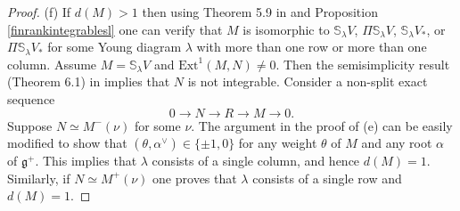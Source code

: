 \documentclass[12pt]{amsart}
\makeatletter
\def\@putname#1#2#3#4{\def\@@ref{#3}\let\old@bf\bf
        \def\bf##1{\old@bf\if?\noexpand##1?{#4}\else##1\fi}%
	#1{#2}%
        \let\bf\old@bf}
\def\@putname#1#2#3#4{\def\@@ref{#3}\let\old@bf\bf	%
	\let\old@reset@font\reset@font			%
        \def\bf##1{\old@bf\if?\noexpand##1?{#4}\else##1\fi}%
	\def\reset@font##1##2{\old@reset@font##1\if?\noexpand##2?{#4}\else##2\fi}#1{#2}%
        \let\bf\old@bf\let\reset@font\old@reset@font}
\let\my@ref=\ref
\def\ref#1{\@putname\my@ref{#1}{#1}{\tiny\rm\@@ref}}
\let\my@cite=\cite
\def\cite#1{\@putname\my@cite{#1}{\@citeb}{\tiny\rm\@@ref}}
\theoremstyle{plain} %
\numberwithin{equation}{section}
\theoremstyle{definition}
\theoremstyle{remark}
\theoremstyle{plain} %
\renewcommand{\gg}{\mathfrak{g}}
\newcommand{\Ext}{\mathrm{Ext}}
\def\gg{\mathfrak{g}}
\makeatother
\begin{document}
\begin{proof}
            
     

            (f) If $d(M)>1$ then using Theorem 5.9 in \cite{CP} and Proposition \ref{finrankintegrablesl} one can verify that 
            $M$ is isomorphic to $\mathbb S_\lambda V $, $\Pi \mathbb S_\lambda V $,  $\mathbb S_\lambda V_*$, or $\Pi \mathbb S_\lambda V_*$ for some Young diagram $\lambda$ with more than one row or more than one column.
            Assume 
            $M=\mathbb  S_\lambda V $ and $\Ext^1(M,N)\neq 0$. Then the semisimplicity result  (Theorem 6.1) in \cite{CP}  implies that $N$ is not integrable.
            Consider a non-split exact sequence $$0\to N\to R\to M\to 0.$$ Suppose  $N \simeq M^- (\nu)$
            for some $\nu$. The argument in the proof of (e) can be easily modified to show that  $(\theta,\alpha^\vee)\in \{\pm 1,0\}$ for any weight $\theta$ of $M$ and any root $\alpha$ of $\gg^+$.
            This implies that $\lambda$ consists of a single column, and hence
            $d(M)=1$. Similarly, if $N\simeq M^+(\nu)$ one proves that $\lambda$ consists of a single row and $d(M)=1$.
           \end{proof}
   
\end{document}
